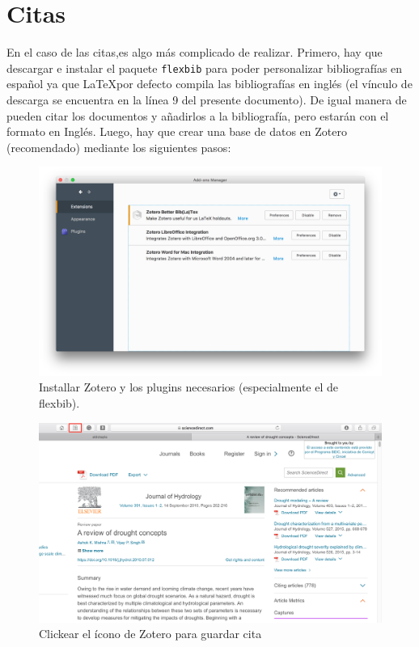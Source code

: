 \documentclass[11pt,]{article}
\begin{document}
\section{Citas\\}

En el caso de las citas,es algo más complicado de realizar. Primero, hay que descargar e instalar el paquete \texttt{flexbib} para poder personalizar bibliografías en español ya que \LaTeX por defecto compila las bibliografías en inglés (el vínculo de descarga se encuentra en la línea 9 del presente documento). De igual manera de pueden citar los documentos y añadirlos a la bibliografía, pero estarán con el formato en Inglés. Luego, hay que crear una base de datos en Zotero (recomendado) mediante los siguientes pasos:\\

\begin{figure}[!h]
\begin{center}
\includegraphics[width=\textwidth]{Figuras/plugins_zotero.png}
\caption{Installar Zotero y los plugins necesarios (especialmente el de flexbib).}
\label{etiqueta_figura1}
\end{center}
\end{figure}

\begin{figure}[!h]
\begin{center}
\includegraphics[width=\textwidth]{Figuras/zotero_web.png}
\caption{Clickear el ícono de Zotero para guardar cita}
\label{etiqueta_figura2}
\end{center}
\end{figure}
\end{document}
